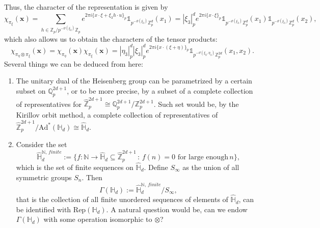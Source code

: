 \documentclass[12pt, reqno]{amsart}
\newcommand{\Q}{\mathbb{Q}}
\newcommand{\N}{\mathbb{N}}
\newcommand{\Z}{\mathbb{Z}}
\newcommand{\1}{\mathds{1}}
\begin{document}
Thus, the character of the representation is given by
\[
\chi_{\pi_\xi}(\mathbf{x}) = \sum_{h \in \mathbb{Z}_p / p^{-\vartheta(\xi_3)} \mathbb{Z}_p} e^{2\pi i \{x \cdot \xi + \xi_3 h \cdot u\}_p} \mathbb{1}_{p^{-\vartheta(\xi_3)} \mathbb{Z}_p^d}(x_1)
= |\xi_3|_p^d e^{2\pi i \{x \cdot \xi\}_p} \mathbb{1}_{p^{-\vartheta(\xi_3)} \mathbb{Z}_p^d}(x_1)\mathbb{1}_{p^{-\vartheta(\xi_3)} \mathbb{Z}_p^d}(x_2),
\]
which also allows us to obtain the characters of the tensor products:
\[
\chi_{\pi_\eta \otimes \pi_\xi}(\mathbf{x}) = \chi_{\pi_\eta}(\mathbf{x})\chi_{\pi_\xi}(\mathbf{x})
= |\eta_3|_p^d |\xi_3|_p^d e^{2\pi i \{x \cdot (\xi + \eta)\}_p} \mathbb{1}_{p^{-\vartheta(\xi_3,\eta_3)} \mathbb{Z}_p^{2d}}(x_1, x_2).
\]
Several things we can be deduced from here:

\begin{enumerate}
    \item The unitary dual of the Heisenberg group can be parametrized by a certain subset on $\Q_p^{2d+1}$, or to be more precise, by a subset of a complete collection of representatives for $\widehat{\Z}_p^{2d+1} \cong \Q_p^{2d+1} / \Z_p^{2d+1}$. Such set would be, by the Kirillov orbit method, a complete collection of representatives of $\widehat{\Z}_p^{2d+1}/ \mathrm{Ad}^* (\mathbb{H}_d) \cong \widehat{\mathbb{H}}_d$.
    \item Consider the set $$\widehat{\mathbb{H}}_d^{\N, \, finite} := \{ f: \N \to \widehat{\mathbb{H}}_d \subseteq \widehat{\Z}_p^{2d+1} \, : \, f(n)=0 \,\, \text{for large enough} \, n  \},$$which is the set of finite sequences on $\widehat{\mathbb{H}}_d$. Define $S_\infty$ as the union of all symmetric groups $S_n$. Then $$\Gamma(\mathbb{H}_d):= \widehat{\mathbb{H}}_d^{\N, \, finite}/ S_\infty,$$that is the collection of all finite unordered sequences of elements of $\widehat{\mathbb{H}}_d$, can be identified with $\mathrm{Rep}(\mathbb{H}_d)$. A natural question would be, can we endow $\Gamma(\mathbb{H}_d)$ with some operation isomorphic to $\otimes$?


\end{enumerate}
\end{document}
